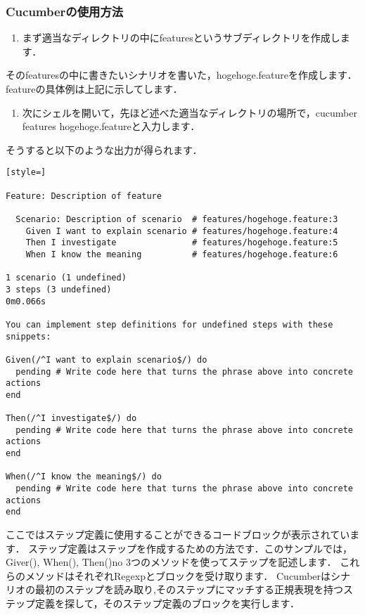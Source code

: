 \subsubsection{Cucumberの使用方法}
\begin{enumerate}
\item まず適当なディレクトリの中にfeaturesというサブディレクトリを作成します．
\end{enumerate}
そのfeaturesの中に書きたいシナリオを書いた，hogehoge.featureを作成します．
featureの具体例は上記に示してします．

\begin{enumerate}
\item 次にシェルを開いて，先ほど述べた適当なディレクトリの場所で，cucumber features hogehoge.featureと入力します．
\end{enumerate}
そうすると以下のような出力が得られます．
\begin{lstlisting}[style=]

Feature: Description of feature

  Scenario: Description of scenario  # features/hogehoge.feature:3
    Given I want to explain scenario # features/hogehoge.feature:4
    Then I investigate               # features/hogehoge.feature:5
    When I know the meaning          # features/hogehoge.feature:6

1 scenario (1 undefined)
3 steps (3 undefined)
0m0.066s

You can implement step definitions for undefined steps with these snippets:

Given(/^I want to explain scenario$/) do
  pending # Write code here that turns the phrase above into concrete actions
end

Then(/^I investigate$/) do
  pending # Write code here that turns the phrase above into concrete actions
end

When(/^I know the meaning$/) do
  pending # Write code here that turns the phrase above into concrete actions
end

\end{lstlisting}
ここではステップ定義に使用することができるコードブロックが表示されています．
ステップ定義はステップを作成するための方法です．このサンプルでは，Giver(), When(), Then()no
3つのメソッドを使ってステップを記述します．
これらのメソッドはそれぞれRegexpとブロックを受け取ります．
Cucumberはシナリオの最初のステップを読み取り,そのステップにマッチする正規表現を持つステップ定義を探して，そのステップ定義のブロックを実行します．

